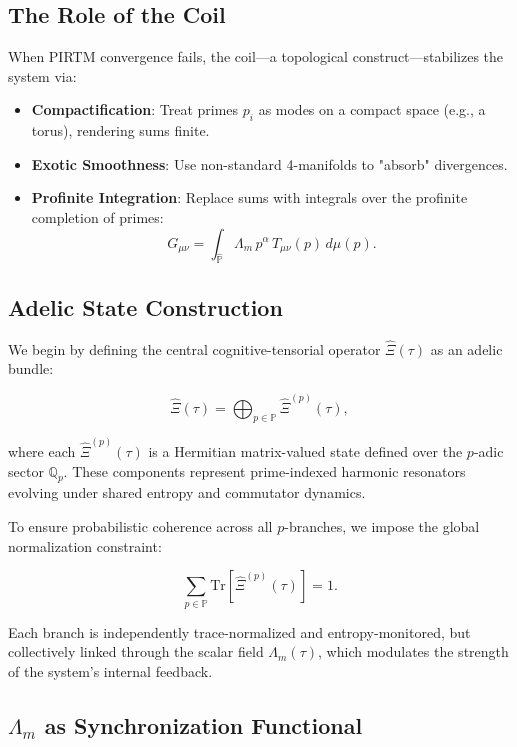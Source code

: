 \documentclass[12pt]{article}
\theoremstyle{plain}
\begin{document}
\subsection{The Role of the Coil}
When PIRTM convergence fails, the coil—a topological construct—stabilizes the system via:
\begin{itemize}
    \item \textbf{Compactification}: Treat primes \( p_i \) as modes on a compact space (e.g., a torus), rendering sums finite.
    \item \textbf{Exotic Smoothness}: Use non-standard 4-manifolds to "absorb" divergences.
    \item \textbf{Profinite Integration}: Replace sums with integrals over the profinite completion of primes:
    \[
    G_{\mu\nu} = \int_{\hat{\mathbb{P}}} \Lambda_m \, p^\alpha \, T_{\mu\nu}(p) \, d\mu(p).
    \]
\end{itemize}

\subsection{Adelic State Construction}

We begin by defining the central cognitive-tensorial operator $\hat{\Xi}(\tau)$ as an adelic bundle:

\begin{equation}
\hat{\Xi}(\tau) = \bigoplus_{p \in \mathbb{P}} \hat{\Xi}^{(p)}(\tau),
\end{equation}

where each $\hat{\Xi}^{(p)}(\tau)$ is a Hermitian matrix-valued state defined over the $p$-adic sector $\mathbb{Q}_p$. These components represent prime-indexed harmonic resonators evolving under shared entropy and commutator dynamics.

To ensure probabilistic coherence across all $p$-branches, we impose the global normalization constraint:

\begin{equation}
\sum_{p \in \mathbb{P}} \text{Tr} \left[ \hat{\Xi}^{(p)}(\tau) \right] = 1.
\end{equation}

Each branch is independently trace-normalized and entropy-monitored, but collectively linked through the scalar field $\Lambda_m(\tau)$, which modulates the strength of the system's internal feedback.

\subsection{$\Lambda_m$ as Synchronization Functional}
\end{document}
